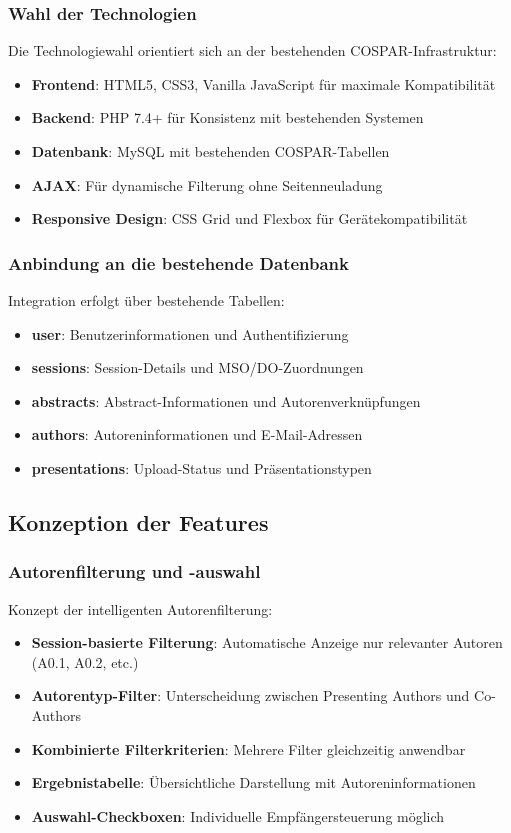 \documentclass[11pt,a4paper]{article}
\begin{document}
\subsubsection{Wahl der Technologien}
Die Technologiewahl orientiert sich an der bestehenden COSPAR-Infrastruktur:
\begin{itemize}
    \item \textbf{Frontend}: HTML5, CSS3, Vanilla JavaScript für maximale Kompatibilität
    \item \textbf{Backend}: PHP 7.4+ für Konsistenz mit bestehenden Systemen
    \item \textbf{Datenbank}: MySQL mit bestehenden COSPAR-Tabellen
    \item \textbf{AJAX}: Für dynamische Filterung ohne Seitenneuladung
    \item \textbf{Responsive Design}: CSS Grid und Flexbox für Gerätekompatibilität
\end{itemize}

\subsubsection{Anbindung an die bestehende Datenbank}
Integration erfolgt über bestehende Tabellen:
\begin{itemize}
    \item \textbf{user}: Benutzerinformationen und Authentifizierung
    \item \textbf{sessions}: Session-Details und MSO/DO-Zuordnungen
    \item \textbf{abstracts}: Abstract-Informationen und Autorenverknüpfungen
    \item \textbf{authors}: Autoreninformationen und E-Mail-Adressen
    \item \textbf{presentations}: Upload-Status und Präsentationstypen
\end{itemize}

\subsection{Konzeption der Features}

\subsubsection{Autorenfilterung und -auswahl}
Konzept der intelligenten Autorenfilterung:
\begin{itemize}
    \item \textbf{Session-basierte Filterung}: Automatische Anzeige nur relevanter Autoren (A0.1, A0.2, etc.)
    \item \textbf{Autorentyp-Filter}: Unterscheidung zwischen Presenting Authors und Co-Authors
    \item \textbf{Kombinierte Filterkriterien}: Mehrere Filter gleichzeitig anwendbar
    \item \textbf{Ergebnistabelle}: Übersichtliche Darstellung mit Autoreninformationen
    \item \textbf{Auswahl-Checkboxen}: Individuelle Empfängersteuerung möglich
\end{itemize}
\end{document}
